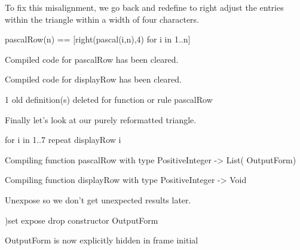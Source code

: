 \begin{xtc}
\begin{xtccomment}
To fix this misalignment, we go back and
redefine  to right adjust the entries within the
triangle within a width of four characters.
\end{xtccomment}
\begin{spadsrc}
pascalRow(n) == [right(pascal(i,n),4) for i in 1..n] 
\end{spadsrc}
\begin{MessageOutput}
   Compiled code for pascalRow has been cleared.
\end{MessageOutput}
\begin{MessageOutput}
   Compiled code for displayRow has been cleared.
\end{MessageOutput}
\begin{MessageOutput}
   1 old definition(s) deleted for function or rule pascalRow 
\end{MessageOutput}
\end{xtc}
%
\begin{xtc}
\begin{xtccomment}
Finally let's look at our purely reformatted triangle.
\end{xtccomment}
\begin{spadsrc}
for i in 1..7 repeat displayRow i 
\end{spadsrc}
\begin{MessageOutput}
   Compiling function pascalRow with type PositiveInteger -> List(
      OutputForm) 
\end{MessageOutput}
\begin{MessageOutput}
   Compiling function displayRow with type PositiveInteger -> Void 
\end{MessageOutput}
\end{xtc}
\begin{xtc}
\begin{xtccomment}
Unexpose  so we don't get unexpected
results later.
\end{xtccomment}
\begin{spadsrc}
)set expose drop constructor OutputForm
\end{spadsrc}
\begin{SysCmdOutput}
   OutputForm is now explicitly hidden in frame initial 
\end{SysCmdOutput}
\end{xtc}



